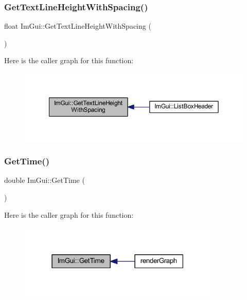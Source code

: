 \subsubsection{\texorpdfstring{Get\+Text\+Line\+Height\+With\+Spacing()}{GetTextLineHeightWithSpacing()}}
{\footnotesize\ttfamily float Im\+Gui\+::\+Get\+Text\+Line\+Height\+With\+Spacing (\begin{DoxyParamCaption}{ }\end{DoxyParamCaption})}

Here is the caller graph for this function\+:
\nopagebreak
\begin{figure}[H]
\begin{center}
\leavevmode
\includegraphics[width=350pt]{namespace_im_gui_aa1616f6082fd210fde8d98c511bf8f56_icgraph}
\end{center}
\end{figure}
\mbox{\label{namespace_im_gui_a3f983cf463367c8fd3a3d5793639dc59}} 
\subsubsection{\texorpdfstring{Get\+Time()}{GetTime()}}
{\footnotesize\ttfamily double Im\+Gui\+::\+Get\+Time (\begin{DoxyParamCaption}{ }\end{DoxyParamCaption})}

Here is the caller graph for this function\+:
\nopagebreak
\begin{figure}[H]
\begin{center}
\leavevmode
\includegraphics[width=271pt]{namespace_im_gui_a3f983cf463367c8fd3a3d5793639dc59_icgraph}
\end{center}
\end{figure}
\mbox{\label{namespace_im_gui_a5c89cb6b42296d0f7db75027efc0fb7a}} 
